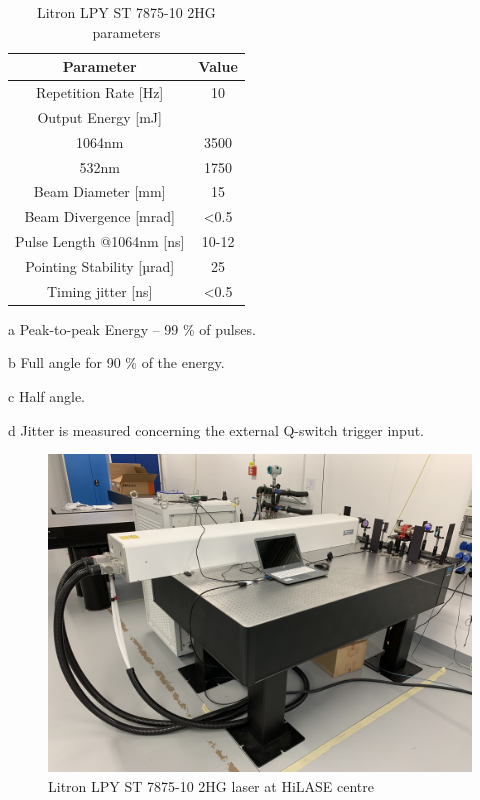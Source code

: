 \begin{table}[h!] 
\centering
    \begin{threeparttable}
        \begin{tabular}{|c | c|} 
        \hline
            \textbf{Parameter} & \textbf{Value} \\ [0.5ex] 
        \hline
        Repetition Rate [Hz] & 10  \\ 
        \hline
            Output Energy [mJ] & \\
            1064nm & 3500 \\
            532nm & 1750 \\
        \hline
            Beam Diameter [mm] & 15 \tnote{a} \\
        \hline
            Beam Divergence [mrad] & \textless 0.5 \tnote{b} \\ 
        \hline
            Pulse Length @1064nm [ns] & 10-12 \\
        \hline
            Pointing Stability [µrad] & 25 \tnote{c} \\
        \hline
            Timing jitter [ns] & \textless 0.5 \tnote{d}  \\
        \hline
        \end{tabular}
        \begin{tablenotes}
            \small
            \item[a] Peak-to-peak Energy -- 99 \% of pulses. 
            \item[b] Full angle for 90 \% of the energy.
            \item[c] Half angle.
            \item[d] Jitter is measured concerning the external Q-switch trigger input.
        \end{tablenotes}
        
    \end{threeparttable}
        \caption[Litron LPY ST 7875-10 2HG parameters]{Litron LPY ST 7875-10 2HG parameters \protect\cite{litronmanual}}
\label{tab:litronparameters}
\end{table}

\begin{figure}[h]
    \centering
    \includegraphics[width=0.6\linewidth]{img/litron.JPG}
    \caption{Litron LPY ST 7875-10 2HG laser at HiLASE centre}
    \label{fig:litron}
\end{figure}






